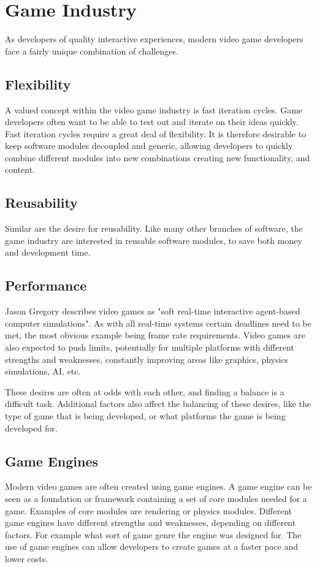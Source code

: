 \section{Game Industry}
As developers of quality interactive experiences, modern video game developers face a fairly unique
combination of challenges.

\subsection{Flexibility}
A valued concept within the video game industry is fast iteration cycles.
Game developers often want to be able to test out and iterate on their ideas quickly.
Fast iteration cycles require a great deal of flexibility.
It is therefore desirable to keep software modules decoupled and generic,
allowing developers to quickly combine different modules into new combinations creating new functionality,
and content.

\subsection{Reusability}
Similar are the desire for reusability.
Like many other branches of software, the game industry are interested in reusable software modules, to save both money and development time.

\subsection{Performance}
Jason Gregory\cite[p. 9]{game_engine_architecture} describes video games as "soft real-time interactive agent-based computer simulations".
As with all real-time systems certain deadlines need to be met, the most obvious example being frame rate requirements.
Video games are also expected to push limits, potentially for multiple platforms with different strengths and weaknesses,
constantly improving areas like graphics, physics simulations, AI, etc.

These desires are often at odds with each other, and finding a balance is a difficult task.
Additional factors also affect the balancing of these desires, like the type of game that is being developed,
or what platforms the game is being developed for.

\subsection{Game Engines}
Modern video games are often created using game engines. A game engine can be seen as a foundation or framework
containing a set of core modules needed for a game. Examples of core modules are rendering or physics modules.
Different game engines have different strengths and weaknesses, depending on different factors.
For example what sort of game genre the engine was designed for.
The use of game engines can allow developers to create games at a faster pace and lower costs.
